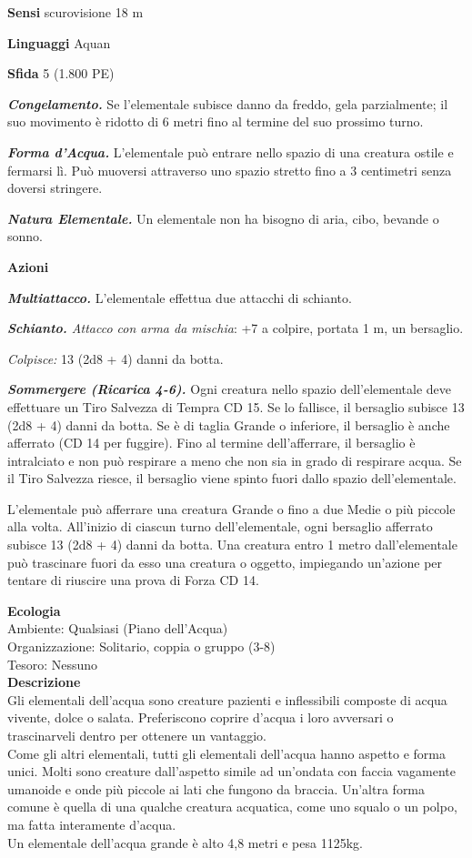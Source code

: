 \begin{multicols}{2}
\textbf{Sensi} scurovisione 18 m

\textbf{Linguaggi} Aquan

\textbf{Sfida} 5 (1.800 PE)

\emph{\textbf{Congelamento.}} Se l'elementale subisce danno da freddo, gela parzialmente; il suo movimento è ridotto di 6 metri fino al termine del suo prossimo turno.

\emph{\textbf{Forma d'Acqua.}} L'elementale può entrare nello spazio di una creatura ostile e fermarsi lì. Può muoversi attraverso uno spazio stretto fino a 3 centimetri senza doversi stringere.

\emph{\textbf{Natura Elementale.}} Un elementale non ha bisogno di aria,
cibo, bevande o sonno.

\textbf{Azioni}

\emph{\textbf{Multiattacco.}} L'elementale effettua due attacchi di
schianto.

\emph{\textbf{Schianto.} Attacco con arma da mischia}: +7 a colpire,
portata 1 m, un bersaglio.

\emph{Colpisce:} 13 (2d8 + 4) danni da botta.

\emph{\textbf{Sommergere (Ricarica 4-6).}} Ogni creatura nello spazio dell'elementale deve effettuare un Tiro Salvezza di Tempra CD 15. Se lo fallisce, il bersaglio subisce 13 (2d8 + 4) danni da botta. Se è di taglia Grande o inferiore, il bersaglio è anche afferrato (CD 14 per fuggire). Fino al termine dell'afferrare, il bersaglio è intralciato e non può respirare a meno che non sia in grado di respirare acqua. Se il Tiro Salvezza riesce, il bersaglio viene spinto fuori dallo spazio
dell'elementale.

L'elementale può afferrare una creatura Grande o fino a due Medie o più piccole alla volta. All'inizio di ciascun turno dell'elementale, ogni bersaglio afferrato subisce 13 (2d8 + 4) danni da botta. Una creatura entro 1 metro dall'elementale può trascinare fuori da esso una creatura o oggetto, impiegando un'azione per tentare di riuscire una prova di Forza CD 14.

\textbf{Ecologia}\\
Ambiente: Qualsiasi (Piano dell'Acqua)\\
Organizzazione: Solitario, coppia o gruppo (3-8)\\
Tesoro: Nessuno\\
\textbf{Descrizione}\\
Gli elementali dell'acqua sono creature pazienti e inflessibili composte di acqua vivente, dolce o salata. Preferiscono coprire d'acqua i loro avversari o trascinarveli dentro per ottenere un vantaggio.\\
Come gli altri elementali, tutti gli elementali dell'acqua hanno aspetto e forma unici. Molti sono creature dall'aspetto simile ad un'ondata con faccia vagamente umanoide e onde più piccole ai lati che fungono da braccia. Un'altra forma comune è quella di una qualche creatura acquatica, come uno squalo o un polpo, ma fatta interamente d'acqua.\\
Un elementale dell'acqua grande è alto 4,8 metri e pesa 1125kg.\\


\end{multicols}
